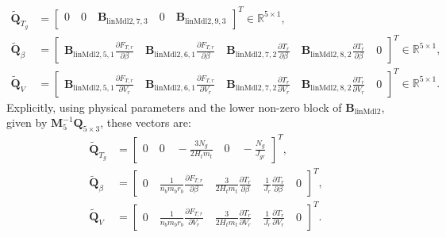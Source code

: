 \begin{align*}
\tilde{\mathbf{Q}}_{T_g} &= \begin{bmatrix}
    0 \quad
    0 \quad
    \bm{B}_{\text{linMdl2}, 7, 3}  \quad
    0 \quad \bm{B}_{\text{linMdl2}, 9, 3} 
\end{bmatrix}^T \in \mathbb{R}^{5 \times 1},\\
\tilde{\mathbf{Q}}_{\beta} &= \begin{bmatrix}
    \bm{B}_{\text{linMdl2}, 5, 1} \frac{\partial F_{T,r}}{\partial{\beta }} \quad
    \bm{B}_{\text{linMdl2}, 6, 1} \frac{\partial F_{T,r}}{\partial{\beta }} \quad
    \bm{B}_{\text{linMdl2}, 7, 2} \frac{\partial T_r}{\partial{\beta }} \quad 
    \bm{B}_{\text{linMdl2}, 8, 2} \frac{\partial T_r}{\partial{\beta }} \quad  0
\end{bmatrix}^T  \in \mathbb{R}^{5 \times 1}, \\ %
\tilde{\mathbf{Q}}_V &=\begin{bmatrix}
    \bm{B}_{\text{linMdl2}, 5, 1} \frac{\partial F_{T,r}}{\partial{V_r }} \quad
    \bm{B}_{\text{linMdl2}, 6, 1} \frac{\partial F_{T,r}}{\partial{V_r }} \quad
    \bm{B}_{\text{linMdl2}, 7, 2} \frac{\partial T_r}{\partial{V_r }} \quad 
    \bm{B}_{\text{linMdl2}, 8, 2} \frac{\partial T_r}{\partial{V_r }} \quad 0
\end{bmatrix}^T  \in \mathbb{R}^{5 \times 1}.
\end{align*}
Explicitly, using physical parameters and the lower non-zero block of \(\bm{B}_{\text{linMdl2}}\), given by \(\mathbf{M}_5^{-1} \mathbf{Q}_{5 \times 3}\), these vectors are:
\begin{align*}
\tilde{\mathbf{Q}}_{T_g} &= 
    \begin{bmatrix}
        0 \quad 0 \quad -\frac{3N_g}{2H_t m_t} \quad 0 \quad -\frac{N_g}{J_{gr}}
    \end{bmatrix}^T, \\
\tilde{\mathbf{Q}}_{\beta} &= 
    \begin{bmatrix}
        0 \quad
        \frac{1}{n_b m_b r_b} \frac{\partial F_{T,r}}{\partial \beta} \quad
        \frac{3}{2 H_t m_t} \frac{\partial T_r}{\partial \beta} \quad
        \frac{1}{J_r} \frac{\partial T_r}{\partial \beta} \quad
        0
    \end{bmatrix}^T, \\
\tilde{\mathbf{Q}}_V &= 
    \begin{bmatrix}
        0 \quad
        \frac{1}{n_b m_b r_b} \frac{\partial F_{T,r}}{\partial V_r} \quad
        \frac{3}{2 H_t m_t} \frac{\partial T_r}{\partial V_r} \quad
        \frac{1}{J_r} \frac{\partial T_r}{\partial V_r} \quad
        0
    \end{bmatrix}^T.
\end{align*}

